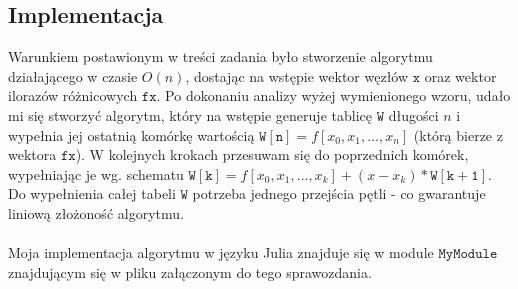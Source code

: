 \subsection{Implementacja}
Warunkiem postawionym w treści zadania było stworzenie algorytmu działającego w czasie $ O(n) $, dostając na wstępie wektor węzłów $\texttt{x}$ oraz wektor ilorazów różnicowych $\texttt{fx}$. Po dokonaniu analizy wyżej wymienionego wzoru, udało mi się stworzyć algorytm, który na wstępie generuje tablicę $ \mathtt{W} $ długości $n$ i wypełnia jej ostatnią komórkę wartością $\mathtt{W[n]} = f[x_0, x_1, \ldots, x_n]$ (którą bierze z wektora $\texttt{fx}$). W kolejnych krokach przesuwam się do poprzednich komórek, wypełniając je wg. schematu  $\mathtt{W[k]} = f[x_0, x_1, \ldots, x_k] + (x-x_k) * \mathtt{W[k + 1]} $. Do wypełnienia całej tabeli $\mathtt{W}$ potrzeba jednego przejścia pętli - co gwarantuje liniową złożoność algorytmu. \\\\
Moja implementacja algorytmu w języku Julia znajduje się w module $ \texttt{MyModule} $ znajdującym się w pliku załączonym do tego sprawozdania.